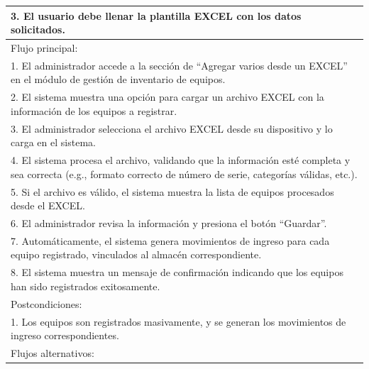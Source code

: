 \documentclass[stu, 12pt, letterpaper, donotrepeattitle, floatsintext, natbib]{apa7}
\begin{document}
\begin{longtable}{@{} p{16.5cm} @{}}
    3. El usuario debe llenar la plantilla EXCEL con los datos solicitados.                                                                                            \\ \midrule
    Flujo principal:                                                                                                                                                   \\
    1. El administrador accede a la sección de ``Agregar varios desde un EXCEL'' en el módulo de gestión de inventario de equipos.                                     \\
    2. El sistema muestra una opción para cargar un archivo EXCEL con la información de los equipos a registrar.                                                       \\
    3. El administrador selecciona el archivo EXCEL desde su dispositivo y lo carga en el sistema.                                                                     \\
    4. El sistema procesa el archivo, validando que la información esté completa y sea correcta (e.g., formato correcto de número de serie, categorías válidas, etc.). \\
    5. Si el archivo es válido, el sistema muestra la lista de equipos procesados desde el EXCEL.                                                                      \\
    6. El administrador revisa la información y presiona el botón ``Guardar''.                                                                                         \\
    7. Automáticamente, el sistema genera movimientos de ingreso para cada equipo registrado, vinculados al almacén correspondiente.                                   \\
    8. El sistema muestra un mensaje de confirmación indicando que los equipos han sido registrados exitosamente.                                                      \\ \midrule
    Postcondiciones:                                                                                                                                                   \\
    1. Los equipos son registrados masivamente, y se generan los movimientos de ingreso correspondientes.                                                              \\ \midrule
    Flujos alternativos:                                                                                                                                               \\

\end{longtable}
\end{document}
